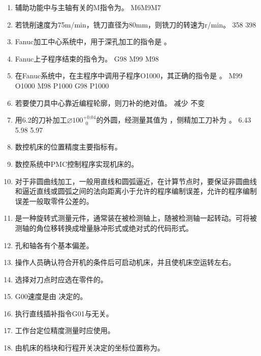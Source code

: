 \documentclass[12pt,twocolumn,landscape,UTF8,twoside]{ctexart}
\begin{document}
\begin{spacing}{1.089}
\begin{enumerate} [1、]
	{Y轴} {Z轴}		{U轴}
%
\item 辅助功能中与主轴有关的M指令为。
 {M6}{M9}{M7}
%
\item 若铣削速度为75m/min，铣刀直径为80mm，则铣刀的转速为r/min。
	{358}	{398}
%
\item Fanuc加工中心系统中，用于深孔加工的指令是		。
%
\item Fanuc上子程序结束的指令为。
	{G98}	{M99}	{M98}
%
\item 在Fanuc系统中，在主程序中调用子程序O1000，其正确的指令是		。
		{M99 O1000}		{M98 P1000}		{G98 P1000}
%
\item 若要使刀具中心靠近编程轮廓，则刀补的绝对值。
	{减少}	{不变}	
%
\item 用6.2的刀补加工$\diameter 100^{+0.04}_{~\; 0}$的外圆，经测量其值为 ，侧精加工刀补为	。
	{6.43}	{5.98}	{5.97}
%
\item 数控机床的位置精度主要指标有。
%
\item 数控系统中PMC控制程序实现机床的。
%
\item 对于非圆曲线加工，一般用直线和圆弧逼近，在计算节点时，要保证非圆曲线和逼近直线或圆弧之间的法向距离小于允许的程序编制误差，允许的程序编制误差一般取零件公差的。
%
\item {}是一种旋转式测量元件，通常装在被检测轴上，随被检测轴一起转动。可将被测轴的角位移转换成增量脉冲形式或绝对式的代码形式。
%
\item 孔和轴各有个基本偏差。
%
\item 操作人员确认符合开机的条件后可启动机床，并且使机床空运转左右。
%
\item 选择对刀点时应选在零件的。
%
\item G00速度是由 决定的。
%
\item 执行直线插补指令G01与无关。
%
\item 工作台定位精度测量时应使用。
%
\item 由机床的档块和行程开关决定的坐标位置称为。

\end{enumerate}
\end{spacing}
\end{document}
